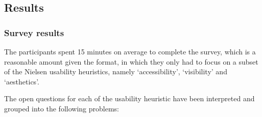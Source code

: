 \documentclass{article}
\begin{document}
\subsection{Results\label{results}}

\subsubsection{Survey results\label{surveyresults}}

The participants spent 15 minutes on average to complete the survey, which is a reasonable amount given the format, in which they
only had to focus on a subset of the Nielsen usability heuristics, namely `accessibility', `visibility' and `aesthetics'.

The open questions for each of the usability heuristic have been interpreted and grouped
into the following problems:
\end{document}
